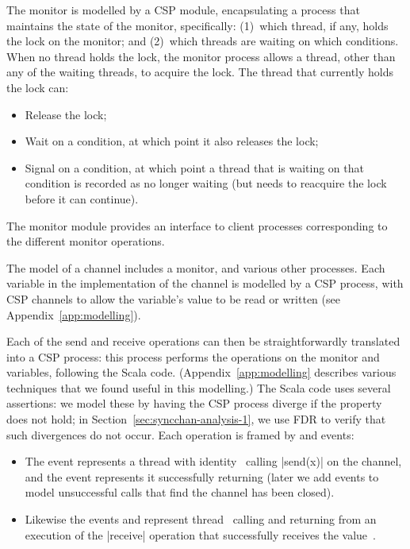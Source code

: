 The monitor is modelled by a CSP module, encapsulating a process that
maintains the state of the monitor, specifically: (1)~which thread, if any,
holds the lock on the monitor; and (2)~which threads are waiting on which
conditions.  When no thread holds the lock, the monitor process allows a
thread, other than any of the waiting threads, to acquire the lock.  The
thread that currently holds the lock can:
\begin{itemize}
\item Release the lock;
\item Wait on a condition, at which point it also releases the lock;
\item Signal on a condition, at which point a thread that is waiting on that
  condition is recorded as no longer waiting (but needs to reacquire the lock
  before it can continue).
\end{itemize}
%
The monitor module provides an interface to client processes corresponding to
the different monitor operations.

The model of a channel includes a monitor, and various other processes.
Each variable in the implementation of the channel is modelled by a CSP
process, with CSP channels to allow the variable's value to be read or
written (see Appendix~\ref{app:modelling}).

Each of the send and receive operations can then be straightforwardly
translated into a CSP process: this process performs the operations on the
monitor and variables, following the Scala code.
(Appendix~\ref{app:modelling} describes various techniques that we found
useful in this modelling.)
%
The Scala code uses several assertions: we model these by having the CSP
process diverge if the property does not hold; in
Section~\ref{sec:syncchan-analysis-1}, we use FDR to verify that such
divergences do not occur.
%
Each operation is framed by  and  events:
%
\begin{itemize}
\item The event  represents a thread with
  identity~ calling |send(x)| on the channel, and the event
   represents it successfully returning (later we
  add events to model unsuccessful calls that find the channel has
  been closed).

\item Likewise the events  and
   represent thread~ calling and
  returning from an execution of the |receive| operation that successfully
  receives the value~.
\end{itemize}
%


